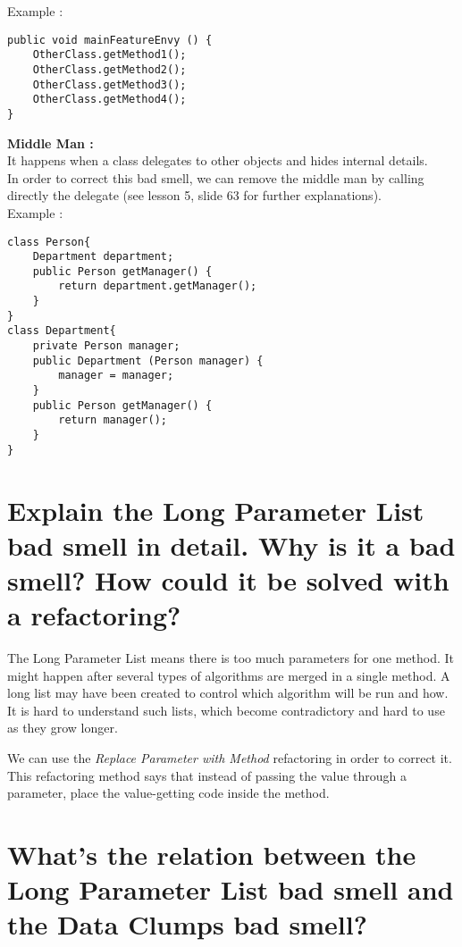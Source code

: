 Example : \\
\begin{lstlisting}
public void mainFeatureEnvy () {
	OtherClass.getMethod1(); 
	OtherClass.getMethod2();
	OtherClass.getMethod3();
	OtherClass.getMethod4();
}
\end{lstlisting}

\vspace{12pt}\textbf{Middle Man :}\\
It happens when a class delegates to other objects and hides internal details.\\
In order to correct this bad smell, we can remove the middle man by calling directly the delegate (see lesson 5, slide 63 for further explanations).\\

Example : \\
\begin{lstlisting}
class Person{
	Department department;
	public Person getManager() {
		return department.getManager();
	}
}
class Department{
	private Person manager;
	public Department (Person manager) {
		manager = manager; 
	}
	public Person getManager() {
		return manager();
	}
}
\end{lstlisting}

\section{Explain the Long Parameter List bad smell in detail. Why is it a bad smell? How could it be
solved with a refactoring?}

The Long Parameter List means there is too much parameters for one method. It might happen after several types of algorithms are merged in a single method. A long list may have been created to control which algorithm will be run and how.\\
It is hard to understand such lists, which become contradictory and hard to use as they grow longer.\newline

We can use the \textit{Replace Parameter with Method} refactoring in order to correct it. This refactoring method says that instead of passing the value through a parameter, place the value-getting code inside the method.

\section{What’s the relation between the Long Parameter List bad smell and the Data Clumps bad
smell?}

